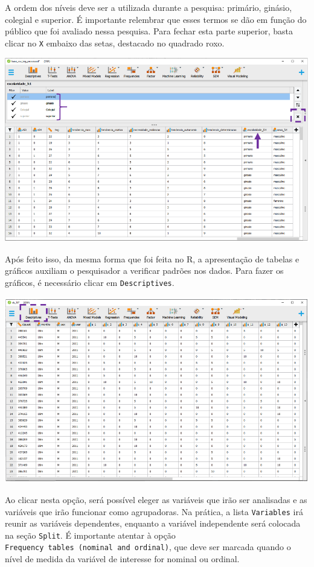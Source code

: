 \documentclass[
]{book}
\begin{document}
A ordem dos níveis deve ser a utilizada durante a pesquisa: primário,
ginásio, colegial e superior. É importante relembrar que esses termos se
dão em função do público que foi avaliado nessa pesquisa. Para fechar
esta parte superior, basta clicar no \texttt{X} embaixo das setas,
destacado no quadrado roxo.

\includegraphics{./img/cap_anova_ordem_variaveis2.png}

Após feito isso, da mesma forma que foi feita no R, a apresentação de
tabelas e gráficos auxiliam o pesquisador a verificar padrões nos dados.
Para fazer os gráficos, é necessário clicar em \texttt{Descriptives}.

\includegraphics{./img/jasp_descriptives.png}

Ao clicar nesta opção, será possível eleger as variáveis que irão ser
analisadas e as variáveis que irão funcionar como agrupadoras. Na
prática, a lista \texttt{Variables} irá reunir as variáveis dependentes,
enquanto a variável independente será colocada na seção \texttt{Split}.
É importante atentar à opção
\texttt{Frequency\ tables\ (nominal\ and\ ordinal)}, que deve ser
marcada quando o nível de medida da variável de interesse for nominal ou
ordinal.
\end{document}
